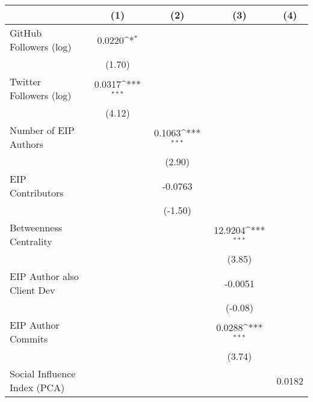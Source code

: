 {
\def\sym#1{\ifmmode^{#1}\else\(^{#1}\)\fi}
\begin{tabular}{l*{4}{c}}
\hline\hline
                                   &\multicolumn{1}{c}{(1)}         &\multicolumn{1}{c}{(2)}         &\multicolumn{1}{c}{(3)}         &\multicolumn{1}{c}{(4)}         \\
\hline
GitHub Followers (log)             &    0.0220\sym{*}  &                   &                   &                   \\
                                   &    (1.70)         &                   &                   &                   \\
[1em]
Twitter Followers (log)            &    0.0317\sym{***}&                   &                   &                   \\
                                   &    (4.12)         &                   &                   &                   \\
[1em]
Number of EIP Authors              &                   &    0.1063\sym{***}&                   &                   \\
                                   &                   &    (2.90)         &                   &                   \\
[1em]
EIP Contributors                   &                   &   -0.0763         &                   &                   \\
                                   &                   &   (-1.50)         &                   &                   \\
[1em]
Betweenness Centrality             &                   &                   &   12.9204\sym{***}&                   \\
                                   &                   &                   &    (3.85)         &                   \\
[1em]
EIP Author also Client Dev         &                   &                   &   -0.0051         &                   \\
                                   &                   &                   &   (-0.08)         &                   \\
[1em]
EIP Author Commits                 &                   &                   &    0.0288\sym{***}&                   \\
                                   &                   &                   &    (3.74)         &                   \\
[1em]
Social Influence Index (PCA)       &                   &                   &                   &    0.0182         \\

\end{tabular}}
